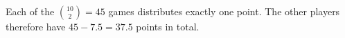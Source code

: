 Each of the $\binom{10}{2}=45$ games distributes exactly one point. The other players therefore have $45-7.5=\boxed{37.5}$ points in total.
